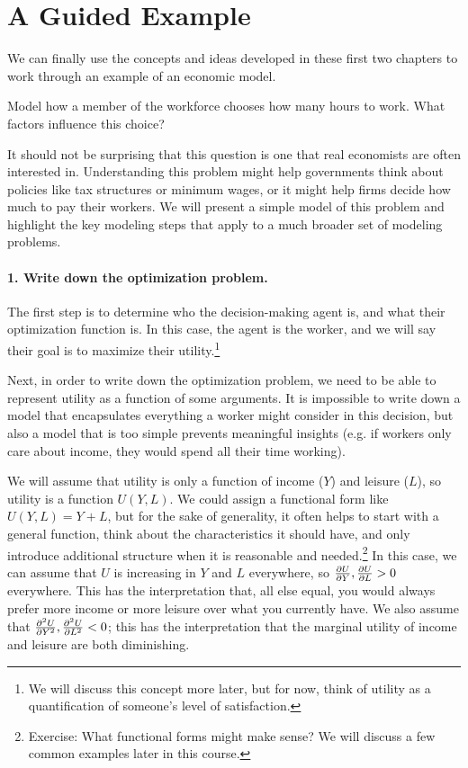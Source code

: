 \section{A Guided Example}

We can finally use the concepts and ideas developed in these first two chapters to work through an example of an economic model. 

\begin{example}
Model how a member of the workforce chooses how many hours to work. What factors influence this choice?
\end{example}

It should not be surprising that this question is one that real economists are often interested in. Understanding this problem might help governments think about policies like tax structures or minimum wages, or it might help firms decide how much to pay their workers. We will present a simple model of this problem and highlight the key modeling steps that apply to a much broader set of modeling problems.

\paragraph{1. Write down the optimization problem.}

The first step is to determine who the decision-making agent is, and what their optimization function is. In this case, the agent is the worker, and we will say their goal is to maximize their utility.\footnote{We will discuss this concept more later, but for now, think of utility as a quantification of someone's level of satisfaction.} 

Next, in order to write down the optimization problem, we need to be able to represent utility as a function of some arguments. It is impossible to write down a model that encapsulates everything a worker might consider in this decision, but also a model that is too simple prevents meaningful insights (e.g. if workers only care about income, they would spend all their time working). 

We will assume that utility is only a function of income ($Y$) and leisure ($L$), so utility is a function $U(Y, L)$. We could assign a functional form like $U(Y, L) = Y + L$, but for the sake of generality, it often helps to start with a general function, think about the characteristics it should have, and only introduce additional structure when it is reasonable and needed.\footnote{Exercise: What functional forms might make sense? We will discuss a few common examples later in this course.} In this case, we can assume that $U$ is increasing in $Y$ and $L$ everywhere, so $\frac{\partial U}{\partial Y}, \frac{\partial U}{\partial L} > 0$ everywhere. This has the interpretation that, all else equal, you would always prefer more income or more leisure over what you currently have. We also assume that $\frac{\partial ^2 U}{\partial Y^2}, \frac{\partial ^2 U}{\partial L^2} < 0$; this has the interpretation that the marginal utility of income and leisure are both diminishing.

